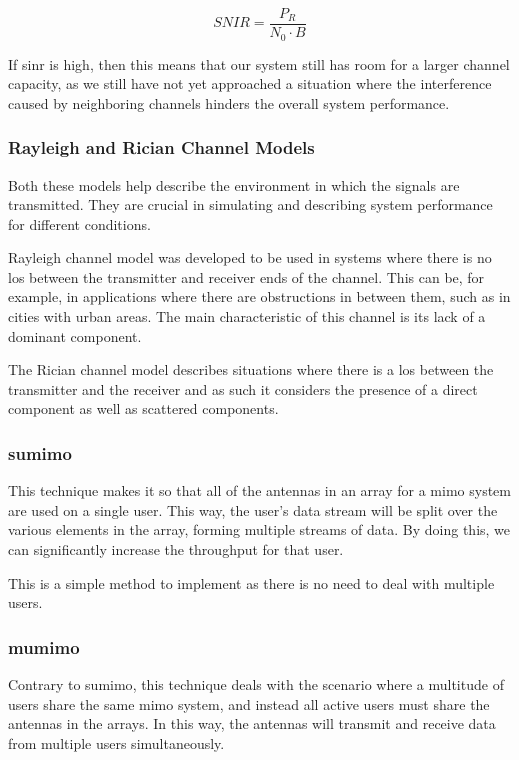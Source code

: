 \begin{equation}
    \label{ch2_snr}
    SNIR = \frac{P_{R}}{N_{0}\cdot B}
\end{equation}

\par If \ac{sinr} is high, then this means that our system still has room for a larger channel capacity, as we still have not yet approached a situation where the interference caused by neighboring channels hinders the overall system performance.

\subsubsection{Rayleigh and Rician Channel Models}
\par Both these models help describe the environment in which the signals are transmitted. They are crucial in simulating and describing system performance for different conditions.

\par Rayleigh channel model was developed to be used in systems where there is no \ac{los} between the transmitter and receiver ends of the channel. This can be, for example, in applications where there are obstructions in between them, such as in cities with urban areas. The main characteristic of this channel is its lack of a dominant component.

\par The Rician channel model describes situations where there is a \ac{los} between the transmitter and the receiver and as such it considers the presence of a direct component as well as scattered components.

\subsubsection{\acl{sumimo}}
\par This technique makes it so that all of the antennas in an array for a \ac{mimo} system are used on a single user. This way, the user's data stream will be split over the various elements in the array, forming multiple streams of data. By doing this, we can significantly increase the throughput for that user.

\par This is a simple method to implement as there is no need to deal with multiple users.

\subsubsection{\acl{mumimo}}
\par Contrary to \ac{sumimo}, this technique deals with the scenario where a multitude of users share the same \ac{mimo} system, and instead all active users must share the antennas in the arrays. In this way, the antennas will transmit and receive data from multiple users simultaneously.

